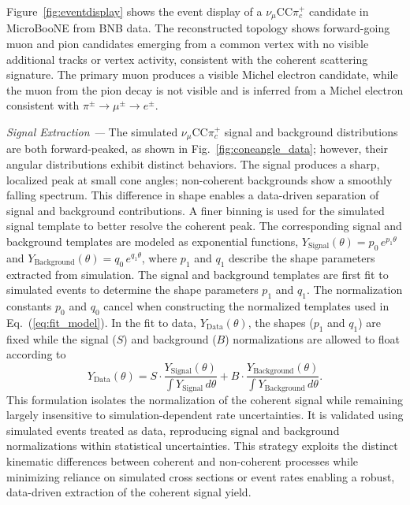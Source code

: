 \documentclass[aps,prl,reprint,superscriptaddress,nofootinbib, showpacs]{revtex4-2}
\begin{document}
Figure~\ref{fig:eventdisplay} shows the event display of a $\nu_\mu$CC$\pi^+_c$ candidate in MicroBooNE from BNB data. The reconstructed topology shows forward-going muon and pion candidates emerging from a common vertex with no visible additional tracks or vertex activity, consistent with the coherent scattering signature. The primary muon produces a visible Michel electron candidate, while the muon from the pion decay is not visible and is inferred from a Michel electron consistent with $\pi^{\pm} \to \mu^{\pm} \to e^{\pm}$.


\textit{Signal Extraction ---} The simulated $\nu_\mu$CC$\pi^+_c$ signal and background distributions are both forward-peaked, as shown in Fig.~\ref{fig:coneangle_data}; however, their angular distributions exhibit distinct behaviors. The signal produces a sharp, localized peak at small cone angles; non-coherent backgrounds show a smoothly falling spectrum. This difference in shape enables a data-driven separation of signal and background contributions. A finer binning is used for the simulated signal template to better resolve the coherent peak. The corresponding signal and background templates are modeled as exponential functions, $Y_{\text{Signal}}(\theta)=p_{0}\,e^{p_{1}\theta}$ and $Y_{\text{Background}}(\theta)=q_{0}\,e^{q_{1}\theta}$, where $p_{1}$ and $q_{1}$ describe the shape parameters extracted from simulation. The signal and background templates are first fit to simulated events to determine the shape parameters $p_1$ and $q_1$. The normalization constants $p_{0}$ and $q_{0}$ cancel when constructing the normalized templates used in Eq.~(\ref{eq:fit_model}). In the fit to data, $Y_{\text{Data}}(\theta)$, the shapes ($p_{1}$ and $q_{1}$) are fixed while the signal ($S$) and background ($B$) normalizations are allowed to float according to
\begin{equation}
Y_{\text{Data}}(\theta) = S \cdot \frac{Y_{\text{Signal}}(\theta)}{\int Y_{\text{Signal}}\,d\theta} 
                  + B \cdot \frac{Y_{\text{Background}}(\theta)}{\int Y_{\text{Background}}\,d\theta}.
\label{eq:fit_model}
\end{equation}
This formulation isolates the normalization of the coherent signal while remaining largely insensitive to simulation-dependent rate uncertainties. It is validated using simulated events treated as data, reproducing signal and background normalizations within statistical uncertainties. This strategy exploits the distinct kinematic differences between coherent and non-coherent processes while minimizing reliance on simulated cross sections or event rates enabling a robust, data-driven extraction of the coherent signal yield.
\end{document}
